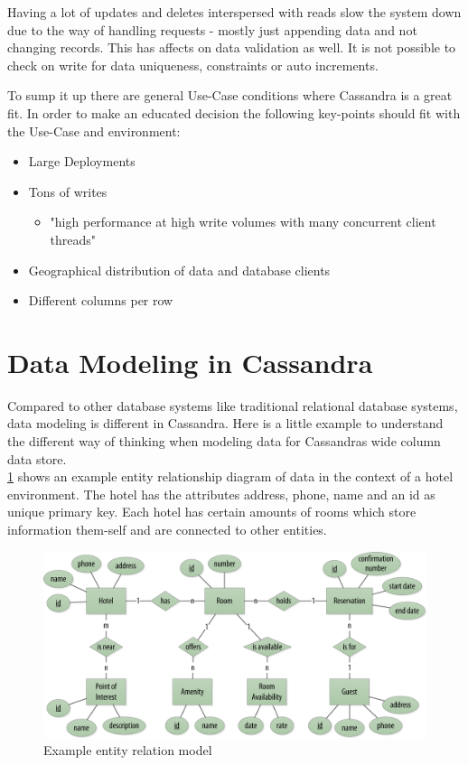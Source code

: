 Having a lot of updates and deletes interspersed with reads slow the system down due to the way of handling requests - mostly just appending data and not changing records. This has affects on data validation as well. It is not possible to check on write for data uniqueness, constraints or auto increments. 

To sump it up there are general Use-Case conditions where Cassandra is a great fit.
In order to make an educated decision the following key-points should fit with the Use-Case and environment:
\begin{itemize}
    \item Large Deployments
    \item Tons of writes
    \begin{itemize}
        \item{"high performance at high write volumes with many concurrent client threads"}
    \end{itemize}
    \item Geographical distribution of data and database clients
    \item Different columns per row
\end{itemize}


\section{Data Modeling in Cassandra}  %

Compared to other database systems like traditional relational database systems, data modeling is different in Cassandra. Here is a little example to understand the different way of thinking when modeling data for Cassandras wide column data store. \\

\ref{fig:cassandra:model_data0} shows an example entity relationship diagram of data in the context of a hotel environment. The hotel has the attributes address, phone, name and an id as unique primary key. Each hotel has certain amounts of rooms which store information them-self and are connected to other entities.

\begin{figure}[H]
    \centering
    \includegraphics[width=0.75\columnwidth]{img/model_example_entity_relation_step0.png}
    \caption{Example entity relation model \autocite{cassandra_oreilly}}
    \label{fig:cassandra:model_data0}
\end{figure}

